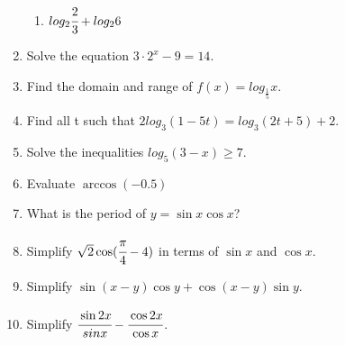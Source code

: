 \documentclass[letterpaper,12pt]{article}
\begin{document}
\begin{enumerate}
\begin{enumerate}
        \item $log_2\cfrac{2}{3}+log_26$
    \end{enumerate}
    \item Solve the equation $3\cdot2^x-9=14$.
    \item Find the domain and range of $f(x)=log_{\frac{1}{5}}x$.
    \item Find all t such that $2log_3(1-5t)=log_3(2t+5)+2$.
    \item Solve the inequalities $log_5(3-x)\ge7$.
    \item Evaluate $\arccos(-0.5)$
    \item What is the period of $y=\sin x\cos x$?
    \item Simplify $\sqrt2\cos(\cfrac{\pi}{4}-4)$ in terms of $\sin x$ and $\cos x$.
    \item Simplify $\sin(x-y)\cos y+\cos(x-y)\sin y$.
    \item Simplify $\cfrac{\sin 2x}{sinx}-\cfrac{\cos 2x}{\cos x}$.
\end{enumerate}
\end{document}
